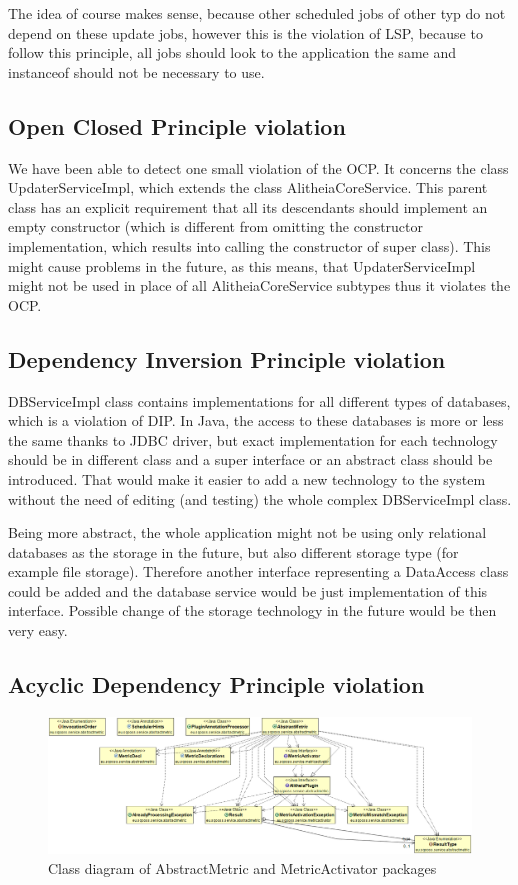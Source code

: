 \documentclass[a4paper,11pt,titlepage]{article}
\begin{document}
The idea of course makes sense, because other scheduled jobs of other typ do not depend on these update jobs, however this is the violation of LSP, because to follow this principle, all jobs should look to the application the same and instanceof should not be necessary to use.

\subsection{Open Closed Principle violation}
We have been able to detect one small violation of the OCP. It concerns the class UpdaterServiceImpl, which extends the class AlitheiaCoreService. This parent class has an explicit requirement that all its descendants should implement an empty constructor (which is different from omitting the constructor implementation, which results into calling the constructor of super class). This might cause problems in the future, as this means, that UpdaterServiceImpl might not be used in place of all AlitheiaCoreService subtypes thus it violates the OCP.

\subsection{Dependency Inversion Principle violation}
DBServiceImpl class contains implementations for all different types of databases, which is a violation of DIP. In Java, the access to these databases is more or less the same thanks to JDBC driver, but exact implementation for each technology should be in different class and a super interface or an abstract class should be introduced. That would make it easier to add a new technology to the system without the need of editing (and testing) the whole complex DBServiceImpl class.

Being more abstract, the whole application might not be using only relational databases as the storage in the future, but also different storage type (for example file storage). Therefore another interface representing a DataAccess class could be added and the database service would be just implementation of this interface. Possible change of the storage technology in the future would be then very easy.

\subsection{Acyclic Dependency Principle violation}

\begin{figure}
\includegraphics[scale=0.3]{class_cyclic_dependency}
\centering
\caption{Class diagram of AbstractMetric and MetricActivator packages}
\label{fig:classmetrics}
\end{figure}
\end{document}
